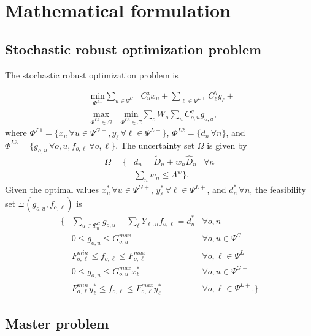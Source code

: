 \section{Mathematical formulation}
\label{section_formulation}

\subsection{Stochastic robust optimization problem}

The stochastic robust optimization problem is

\begin{align}
&\label{saro_obj} \underset{\Phi^{L1}}{\text{min}} \sum\limits_{u \in \Psi^{G+}} C^x_{u} x_{u} + \sum\limits_{\ell \in \Psi^{L+}} C^y_{\ell} y_{\ell} +  \\
&\underset{\Phi^{L2} \in \Omega}{\text{max}} \quad \underset{\Phi^{L3} \in \Xi}{\text{min}} \sum\limits_o W_o \sum\limits_{u} C^g_{o, u} g_{o, u},
\end{align}
where $\Phi^{L1} = \{ x_u \, \forall u \in  \Psi^{G+}, y_\ell \, \forall \ell \in  \Psi^{L+} \}$, $\Phi^{L2} = \{ d_n \, \forall n \}$, and $\Phi^{L3} = \{ g_{o,u} \, \forall o,u, f_{o, \ell} \, \forall o, \ell \}$. The uncertainty set $\Omega$ is given by
\begin{align}
\Omega = \{ &d_n = \tilde{D}_n + w_n \hat{D}_n & \forall n \nonumber \\
\label{uncertainty_set}&\sum\limits_n w_n \leq \Lambda^w \}.
\end{align}
Given the optimal values $x_u^* \, \forall u \in \Psi^{G+}$, $y_\ell^* \, \forall \ell \in \Psi^{L+}$, and $d_n^* \, \forall n$, the feasibility set $\Xi(g_{o, u}, f_{o, \ell})$ is
\begin{align}
\{ &\sum\limits_{u \in \Psi^G_{n}} g_{o, u} + \sum\limits_{\ell} Y_{\ell, n} f_{o, \ell} = d_{n}^* & \forall o, n\\
&0 \leq g_{o, u} \leq G_{o, u}^{max} & \forall o, u \in \Psi^G\\
&F_{o, \ell}^{min} \leq f_{o, \ell} \leq F_{o, \ell}^{max} & \forall o, \ell \in \Psi^L \\
&0 \leq g_{o, u} \leq G_{o, u}^{max} x_\ell^* & \forall o, u \in \Psi^{G+} \\
&F_{o, \ell}^{min} y_\ell^* \leq f_{o, \ell} \leq F_{o, \ell}^{max} y_\ell^* & \forall o, \ell \in \Psi^{L+}. \}
\end{align}

\subsection{Master problem}

